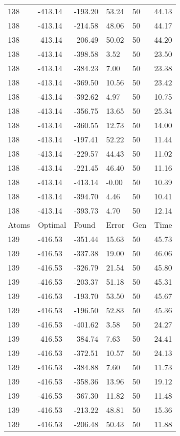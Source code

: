 \documentclass{report}
\begin{document}
\begin{appendix}
\begin{longtable}{llllll}
138 & -413.14 & -193.20 & 53.24 & 50 & 44.13 \\
138 & -413.14 & -214.58 & 48.06 & 50 & 44.17 \\
138 & -413.14 & -206.49 & 50.02 & 50 & 44.20 \\
138 & -413.14 & -398.58 & 3.52 & 50 & 23.50 \\
138 & -413.14 & -384.23 & 7.00 & 50 & 23.38 \\
138 & -413.14 & -369.50 & 10.56 & 50 & 23.42 \\
138 & -413.14 & -392.62 & 4.97 & 50 & 10.75 \\
138 & -413.14 & -356.75 & 13.65 & 50 & 25.34 \\
138 & -413.14 & -360.55 & 12.73 & 50 & 14.00 \\
138 & -413.14 & -197.41 & 52.22 & 50 & 11.44 \\
138 & -413.14 & -229.57 & 44.43 & 50 & 11.02 \\
138 & -413.14 & -221.45 & 46.40 & 50 & 11.16 \\
138 & -413.14 & -413.14 & -0.00 & 50 & 10.39 \\
138 & -413.14 & -394.70 & 4.46 & 50 & 10.41 \\
138 & -413.14 & -393.73 & 4.70 & 50 & 12.14 \\
Atoms & Optimal & Found & Error & Gen & Time \\
139 & -416.53 & -351.44 & 15.63 & 50 & 45.73 \\
139 & -416.53 & -337.38 & 19.00 & 50 & 46.06 \\
139 & -416.53 & -326.79 & 21.54 & 50 & 45.80 \\
139 & -416.53 & -203.37 & 51.18 & 50 & 45.31 \\
139 & -416.53 & -193.70 & 53.50 & 50 & 45.67 \\
139 & -416.53 & -196.50 & 52.83 & 50 & 45.36 \\
139 & -416.53 & -401.62 & 3.58 & 50 & 24.27 \\
139 & -416.53 & -384.74 & 7.63 & 50 & 24.41 \\
139 & -416.53 & -372.51 & 10.57 & 50 & 24.13 \\
139 & -416.53 & -384.88 & 7.60 & 50 & 11.73 \\
139 & -416.53 & -358.36 & 13.96 & 50 & 19.12 \\
139 & -416.53 & -367.30 & 11.82 & 50 & 11.48 \\
139 & -416.53 & -213.22 & 48.81 & 50 & 15.36 \\
139 & -416.53 & -206.48 & 50.43 & 50 & 11.88 \\

\end{longtable}
\end{appendix}
\end{document}
